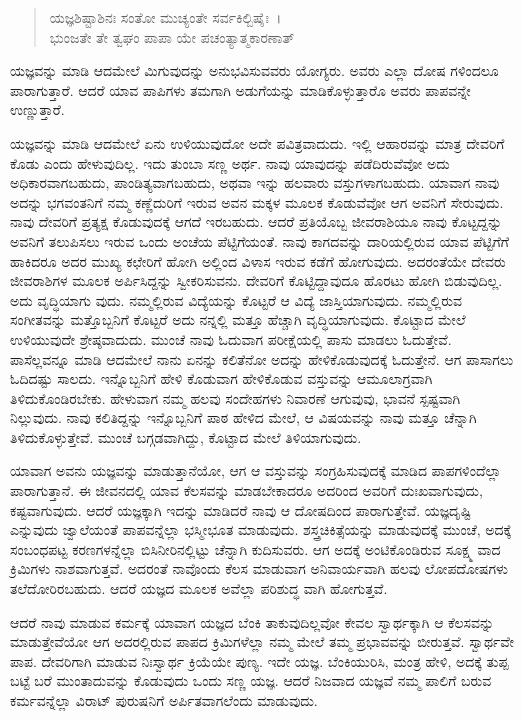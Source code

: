 \begin{verse}
ಯಜ್ಞಶಿಷ್ಟಾಶಿನಃ ಸಂತೋ ಮುಚ್ಯಂತೇ ಸರ್ವಕಿಲ್ಬಿಷೈಃ~।\\ಭುಂಜತೇ ತೇ ತ್ವಘಂ ಪಾಪಾ ಯೇ ಪಚಂತ್ಯಾತ್ಮಕಾರಣಾತ್ 
\end{verse}

{\small ಯಜ್ಞವನ್ನು ಮಾಡಿ ಆದಮೇಲೆ ಮಿಗುವುದನ್ನು ಅನುಭವಿಸುವವರು ಯೋಗ್ಯರು. ಅವರು ಎಲ್ಲಾ ದೋಷ ಗಳಿಂದಲೂ ಪಾರಾಗುತ್ತಾರೆ. ಆದರೆ ಯಾವ ಪಾಪಿಗಳು ತಮಗಾಗಿ ಅಡುಗೆಯನ್ನು ಮಾಡಿಕೊಳ್ಳುತ್ತಾರೊ ಅವರು ಪಾಪವನ್ನೇ ಉಣ್ಣುತ್ತಾರೆ.}

ಯಜ್ಞವನ್ನು ಮಾಡಿ ಆದಮೇಲೆ ಏನು ಉಳಿಯುವುದೋ ಅದೇ ಪವಿತ್ರವಾದುದು. ಇಲ್ಲಿ ಆಹಾರವನ್ನು ಮಾತ್ರ ದೇವರಿಗೆ ಕೊಡು ಎಂದು ಹೇಳುವುದಿಲ್ಲ. ಇದು ತುಂಬಾ ಸಣ್ಣ ಅರ್ಥ. ನಾವು ಯಾವುದನ್ನು ಪಡೆದಿರುವೆವೋ ಅದು ಅಧಿಕಾರವಾಗಬಹುದು, ಪಾಂಡಿತ್ಯವಾಗಬಹುದು, ಅಥವಾ ಇನ್ನು ಹಲವಾರು ವಸ್ತುಗಳಾಗಬಹುದು. ಯಾವಾಗ ನಾವು ಅದನ್ನು ಭಗವಂತನಿಗೆ ನಮ್ಮ ಕಣ್ಣೆದುರಿಗೆ ಇರುವ ಅವನ ಮಕ್ಕಳ ಮೂಲಕ ಕೊಡುವೆವೋ ಆಗ ಅವನಿಗೆ ಸೇರುವುದು. ನಾವು ದೇವರಿಗೆ ಪ್ರತ್ಯಕ್ಷ ಕೊಡುವುದಕ್ಕೆ ಆಗದೆ ಇರಬಹುದು. ಆದರೆ ಪ್ರತಿಯೊಬ್ಬ ಜೀವರಾಶಿಯೂ ನಾವು ಕೊಟ್ಟದ್ದನ್ನು ಅವನಿಗೆ ತಲುಪಿಸಲು ಇರುವ ಒಂದು ಅಂಚೆಯ ಪೆಟ್ಟಿಗೆಯಂತೆ. ನಾವು ಕಾಗದವನ್ನು ದಾರಿಯಲ್ಲಿರುವ ಯಾವ ಪೆಟ್ಟಿಗೆಗೆ ಹಾಕಿದರೂ ಅದರ ಮುಖ್ಯ ಕಛೇರಿಗೆ ಹೋಗಿ ಅಲ್ಲಿಂದ ವಿಳಾಸ ಇರುವ ಕಡೆಗೆ ಹೋಗುವುದು. ಅದರಂತೆಯೇ ದೇವರು ಜೀವರಾಶಿಗಳ ಮೂಲಕ ಅರ್ಪಿಸಿದ್ದನ್ನು ಸ್ವೀಕರಿಸುವನು. ದೇವರಿಗೆ ಕೊಟ್ಟಿದ್ದಾವುದೂ ಹೊರಟು ಹೋಗಿ ಬಿಡುವುದಿಲ್ಲ. ಅದು ವೃದ್ಧಿಯಾಗು ವುದು. ನಮ್ಮಲ್ಲಿರುವ ವಿದ್ಯೆಯನ್ನು ಕೊಟ್ಟರೆ ಆ ವಿದ್ಯೆ ಜಾಸ್ತಿಯಾಗುವುದು. ನಮ್ಮಲ್ಲಿರುವ ಸಂಗೀತವನ್ನು ಮತ್ತೊಬ್ಬನಿಗೆ ಕೊಟ್ಟರೆ ಅದು ನನ್ನಲ್ಲಿ ಮತ್ತೂ ಹೆಚ್ಚಾಗಿ ವೃದ್ಧಿಯಾಗುವುದು. ಕೊಟ್ಟಾದ ಮೇಲೆ ಉಳಿಯುವುದೇ ಶ್ರೇಷ್ಠವಾದುದು. ಮುಂಚೆ ನಾವು ಓದುವಾಗ ಪರೀಕ್ಷೆಯಲ್ಲಿ ಪಾಸು ಮಾಡಲು ಓದುತ್ತೇವೆ. ಪಾಸೆಲ್ಲವನ್ನೂ ಮಾಡಿ ಆದಮೇಲೆ ನಾನು ಏನನ್ನು ಕಲಿತೆನೋ ಅದನ್ನು ಹೇಳಿಕೊಡುವುದಕ್ಕೆ ಓದುತ್ತೇನೆ. ಆಗ ಪಾಸಾಗಲು ಓದಿದಷ್ಟು ಸಾಲದು. ಇನ್ನೊಬ್ಬನಿಗೆ ಹೇಳಿ ಕೊಡುವಾಗ ಹೇಳಿಕೊಡುವ ವಸ್ತುವನ್ನು ಆಮೂಲಾಗ್ರವಾಗಿ ತಿಳಿದುಕೊಂಡಿರಬೇಕು. ಹೇಳುವಾಗ ನಮ್ಮ ಹಲವು ಸಂದೇಹಗಳು ನಿವಾರಣೆ ಆಗುವುವು, ಭಾವನೆ ಸ್ಪಷ್ಟವಾಗಿ ನಿಲ್ಲುವುದು. ನಾವು ಕಲಿತಿದ್ದನ್ನು ಇನ್ನೊಬ್ಬನಿಗೆ ಪಾಠ ಹೇಳಿದ ಮೇಲೆ, ಆ ವಿಷಯವನ್ನು ನಾವು ಮತ್ತೂ ಚೆನ್ನಾಗಿ ತಿಳಿದುಕೊಳ್ಳುತ್ತೇವೆ. ಮುಂಚೆ ಬಗ್ಗಡವಾಗಿದ್ದು, ಕೊಟ್ಟಾದ ಮೇಲೆ ತಿಳಿಯಾಗುವುದು.

ಯಾವಾಗ ಅವನು ಯಜ್ಞವನ್ನು ಮಾಡುತ್ತಾನೆಯೋ, ಆಗ ಆ ವಸ್ತುವನ್ನು ಸಂಗ್ರಹಿಸುವುದಕ್ಕೆ ಮಾಡಿದ ಪಾಪಗಳಿಂದೆಲ್ಲಾ ಪಾರಾಗುತ್ತಾನೆ. ಈ ಜೀವನದಲ್ಲಿ ಯಾವ ಕೆಲಸವನ್ನು ಮಾಡಬೇಕಾದರೂ ಅದರಿಂದ ಅವರಿಗೆ ದುಃಖವಾಗುವುದು, ಕಷ್ಟವಾಗುವುದು. ಆದರೆ ಯಜ್ಞಕ್ಕಾಗಿ ಇದನ್ನು ಮಾಡಿದರೆ ನಾವು ಆ ದೋಷದಿಂದ ಪಾರಾಗುತ್ತೇವೆ. ಯಜ್ಞದೃಷ್ಟಿ ಎನ್ನುವುದು ಜ್ವಾಲೆಯಂತೆ ಪಾಪವನ್ನೆಲ್ಲಾ ಭಸ್ಮೀಭೂತ ಮಾಡುವುದು. ಶಸ್ತ್ರಚಿಕಿತ್ಸೆಯನ್ನು ಮಾಡುವುದಕ್ಕೆ ಮುಂಚೆ, ಅದಕ್ಕೆ ಸಂಬಂಧಪಟ್ಟ ಕರಣಗಳನ್ನೆಲ್ಲಾ ಬಿಸಿನೀರಿನಲ್ಲಿಟ್ಟು ಚೆನ್ನಾಗಿ ಕುದಿಸುವರು. ಆಗ ಅದಕ್ಕೆ ಅಂಟಿಕೊಂಡಿರುವ ಸೂಕ್ಷ್ಮ ವಾದ ಕ್ರಿಮಿಗಳು ನಾಶವಾಗುತ್ತವೆ. ಅದರಂತೆ ನಾವೊಂದು ಕೆಲಸ ಮಾಡುವಾಗ ಅನಿವಾರ್ಯವಾಗಿ ಹಲವು ಲೋಪದೋಷಗಳು ತಲೆದೋರಿರಬಹುದು. ಆದರೆ ಯಜ್ಞದ ಮೂಲಕ ಅವೆಲ್ಲಾ ಪರಿಶುದ್ಧ ವಾಗಿ ಹೋಗುತ್ತವೆ.

ಆದರೆ ನಾವು ಮಾಡುವ ಕರ್ಮಕ್ಕೆ ಯಾವಾಗ ಯಜ್ಞದ ಬೆಂಕಿ ತಾಕುವುದಿಲ್ಲವೋ ಕೇವಲ ಸ್ವಾರ್ಥಕ್ಕಾಗಿ ಆ ಕೆಲಸವನ್ನು ಮಾಡುತ್ತೇವೆಯೋ ಆಗ ಅದರಲ್ಲಿರುವ ಪಾಪದ ಕ್ರಿಮಿಗಳೆಲ್ಲಾ ನಮ್ಮ ಮೇಲೆ ತಮ್ಮ ಪ್ರಭಾವವನ್ನು ಬೀರುತ್ತವೆ. ಸ್ವಾರ್ಥವೇ ಪಾಪ. ದೇವರಿಗಾಗಿ ಮಾಡುವ ನಿಃಸ್ವಾರ್ಥ ಕ್ರಿಯೆಯೇ ಪುಣ್ಯ. ಇದೇ ಯಜ್ಞ. ಬೆಂಕಿಯುರಿಸಿ, ಮಂತ್ರ ಹೇಳಿ, ಅದಕ್ಕೆ ತುಪ್ಪ ಬಟ್ಟೆ ಬರೆ ಮುಂತಾದುವನ್ನು ಕೊಡುವುದು ಒಂದು ಸಣ್ಣ ಯಜ್ಞ. ಆದರೆ ನಿಜವಾದ ಯಜ್ಞವೆ ನಮ್ಮ ಪಾಲಿಗೆ ಬರುವ ಕರ್ಮವನ್ನೆಲ್ಲಾ ವಿರಾಟ್ ಪುರುಷನಿಗೆ ಅರ್ಪಿತವಾಗಲೆಂದು ಮಾಡುವುದು.

